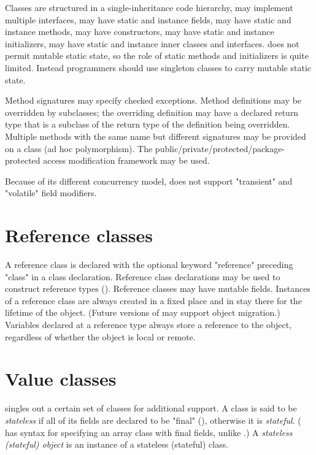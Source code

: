 Classes are structured in a single-inheritance code
hierarchy, may implement multiple interfaces, may have static and
instance fields, may have static and instance methods, may have
constructors, may have static and instance initializers, may have
static and instance inner classes and interfaces. \Xten{} does not
permit mutable static state, so the role of static methods and
initializers is quite limited. Instead programmers should use
singleton classes to carry mutable static state.

Method signatures may specify checked exceptions. Method definitions
may be overridden by subclasses; the overriding definition may have a
declared return type that is a subclass of the return type of the
definition being overridden. Multiple methods with the same name but
different signatures may be provided on a class (ad hoc
polymorphism). The public/private/protected/package-protected access
modification framework may be used.


Because of its different concurrency model, \Xten{} does not support
\xcd"transient" and \xcd"volatile" field modifiers.


\section{Reference classes}\label{ReferenceClasses}
A reference class is declared with the optional keyword \xcd"reference" preceding \xcd"class" in a class declaration. Reference
class declarations may be used to construct reference types
(). Reference classes may have mutable
fields. Instances of a reference class are always created in a fixed
place and in \XtenCurrVer{} stay there for the lifetime of the
object. (Future versions of \Xten{} may support object migration.)
Variables declared at a reference type always store a reference to the
object, regardless of whether the object is local or remote.

\section{Value classes}\label{ValueClasses}

{}\Xten{} singles out a certain set of classes for additional
support. A class is said to be {\em stateless} if all of its fields
are declared to be \xcd"final" (), otherwise it
is {\em stateful}. (\Xten{} has syntax for specifying an array class
with final fields, unlike \java{}.) A {\em stateless (stateful)
object} is an instance of a stateless (stateful) class.

